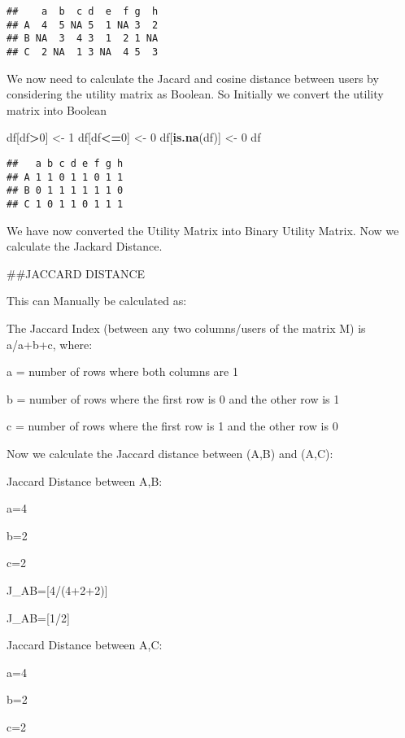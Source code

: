 \documentclass[
]{article}
\newenvironment{Shaded}{\begin{snugshade}}{\end{snugshade}}
\newcommand{\DecValTok}[1]{\textcolor[rgb]{0.00,0.00,0.81}{#1}}
\newcommand{\KeywordTok}[1]{\textcolor[rgb]{0.13,0.29,0.53}{\textbf{#1}}}
\newcommand{\NormalTok}[1]{#1}
\newcommand{\OperatorTok}[1]{\textcolor[rgb]{0.81,0.36,0.00}{\textbf{#1}}}
\newcommand{\StringTok}[1]{\textcolor[rgb]{0.31,0.60,0.02}{#1}}
\begin{document}
\begin{verbatim}
##    a  b  c d  e  f g  h
## A  4  5 NA 5  1 NA 3  2
## B NA  3  4 3  1  2 1 NA
## C  2 NA  1 3 NA  4 5  3
\end{verbatim}

We now need to calculate the Jacard and cosine distance between users by
considering the utility matrix as Boolean. So Initially we convert the
utility matrix into Boolean

\begin{Shaded}
\begin{Highlighting}[]
\NormalTok{df[df}\OperatorTok{>}\DecValTok{0}\NormalTok{] <-}\StringTok{ }\DecValTok{1}
\NormalTok{df[df}\OperatorTok{<=}\DecValTok{0}\NormalTok{] <-}\StringTok{ }\DecValTok{0}
\NormalTok{df[}\KeywordTok{is.na}\NormalTok{(df)] <-}\StringTok{ }\DecValTok{0}
\NormalTok{df}
\end{Highlighting}
\end{Shaded}

\begin{verbatim}
##   a b c d e f g h
## A 1 1 0 1 1 0 1 1
## B 0 1 1 1 1 1 1 0
## C 1 0 1 1 0 1 1 1
\end{verbatim}

We have now converted the Utility Matrix into Binary Utility Matrix. Now
we calculate the Jackard Distance.

\#\#JACCARD DISTANCE

This can Manually be calculated as:

The Jaccard Index (between any two columns/users of the matrix M) is
a/a+b+c, where:

a = number of rows where both columns are 1

b = number of rows where the first row is 0 and the other row is 1

c = number of rows where the first row is 1 and the other row is 0

Now we calculate the Jaccard distance between (A,B) and (A,C):

Jaccard Distance between A,B:

a=4

b=2

c=2

J\_AB={[}4/(4+2+2){]}

J\_AB={[}1/2{]}

Jaccard Distance between A,C:

a=4

b=2

c=2
\end{document}
